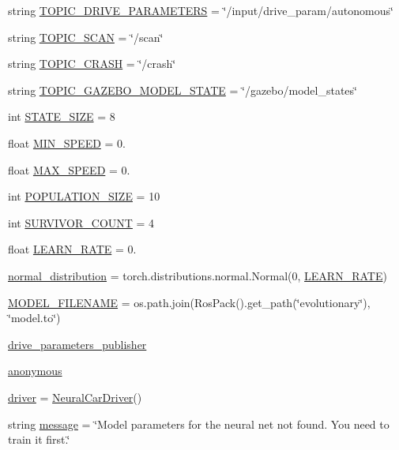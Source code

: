 \begin{DoxyCompactItemize}
\item 
string \hyperlink{namespaceneural__car__driver_a161258e51d15f04d9063e42ef5c7be6a}{T\+O\+P\+I\+C\+\_\+\+D\+R\+I\+V\+E\+\_\+\+P\+A\+R\+A\+M\+E\+T\+E\+RS} = \char`\"{}/input/drive\+\_\+param/autonomous\char`\"{}
\item 
string \hyperlink{namespaceneural__car__driver_aa0a0413ce25fecb4d35f07c7fea06a8c}{T\+O\+P\+I\+C\+\_\+\+S\+C\+AN} = \char`\"{}/scan\char`\"{}
\item 
string \hyperlink{namespaceneural__car__driver_a6f5373020b03b73072779ffc5d44482d}{T\+O\+P\+I\+C\+\_\+\+C\+R\+A\+SH} = \char`\"{}/crash\char`\"{}
\item 
string \hyperlink{namespaceneural__car__driver_a8e8319dbdbdbc3c32c3184c82f9c3f80}{T\+O\+P\+I\+C\+\_\+\+G\+A\+Z\+E\+B\+O\+\_\+\+M\+O\+D\+E\+L\+\_\+\+S\+T\+A\+TE} = \char`\"{}/gazebo/model\+\_\+states\char`\"{}
\item 
int \hyperlink{namespaceneural__car__driver_ac9d3bc133f799be5e8c5c55884d10a8d}{S\+T\+A\+T\+E\+\_\+\+S\+I\+ZE} = 8
\item 
float \hyperlink{namespaceneural__car__driver_a5292cc13090a4c357e023f5732a8a18a}{M\+I\+N\+\_\+\+S\+P\+E\+ED} = 0.
\item 
float \hyperlink{namespaceneural__car__driver_af2fef2c19127bf0b4e990d28542c7b6f}{M\+A\+X\+\_\+\+S\+P\+E\+ED} = 0.
\item 
int \hyperlink{namespaceneural__car__driver_aaf8ade0766a9fd72a41c1029d04d6d5e}{P\+O\+P\+U\+L\+A\+T\+I\+O\+N\+\_\+\+S\+I\+ZE} = 10
\item 
int \hyperlink{namespaceneural__car__driver_ad40064153991947271d4a197983593fa}{S\+U\+R\+V\+I\+V\+O\+R\+\_\+\+C\+O\+U\+NT} = 4
\item 
float \hyperlink{namespaceneural__car__driver_a3873d214234a7685f0003bdedb09a3b5}{L\+E\+A\+R\+N\+\_\+\+R\+A\+TE} = 0.
\item 
\hyperlink{namespaceneural__car__driver_a953d05d55cd2232a21159009976855f3}{normal\+\_\+distribution} = torch.\+distributions.\+normal.\+Normal(0, \hyperlink{namespaceneural__car__driver_a3873d214234a7685f0003bdedb09a3b5}{L\+E\+A\+R\+N\+\_\+\+R\+A\+TE})
\item 
\hyperlink{namespaceneural__car__driver_a067bf25e6557471566d69b477b79ade5}{M\+O\+D\+E\+L\+\_\+\+F\+I\+L\+E\+N\+A\+ME} = os.\+path.\+join(Ros\+Pack().get\+\_\+path(\char`\"{}evolutionary\char`\"{}), \char`\"{}model.\+to\char`\"{})
\item 
\hyperlink{namespaceneural__car__driver_ac075b2fda9db2b43e338511958cfe9c2}{drive\+\_\+parameters\+\_\+publisher}
\item 
\hyperlink{namespaceneural__car__driver_ae254923f6ec524f563a598feeee010b9}{anonymous}
\item 
\hyperlink{namespaceneural__car__driver_a277afd40b4a20897467cac1f802344ee}{driver} = \hyperlink{classneural__car__driver_1_1_neural_car_driver}{Neural\+Car\+Driver}()
\item 
string \hyperlink{namespaceneural__car__driver_a65829420a3ca6888c41c04e36ad0c4fb}{message} = \char`\"{}Model parameters for the neural net not found. You need to train it first.\char`\"{}
\end{DoxyCompactItemize}



